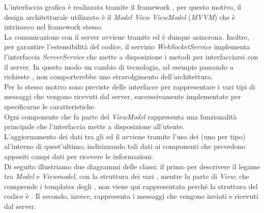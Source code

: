 L'interfaccia grafica è realizzata tramite il framework , per questo motivo, il design architetturale utilizzato è il \textit{Model View ViewModel} (\textit{MVVM}) che è intrinseco nel framework stesso. \\
La comunicazione con il server avviene tramite  ed è dunque asincrona. 
Inoltre, per garantire l'estensibilità del codice, il servizio \textit{WebSocketService} implementa l'interfaccia \textit{ServerService} che mette a disposizione i metodi per interfacciarsi con il server. In questo modo un cambio di tecnologia, ad esempio passando a richieste , non comporterebbe uno stravolgimento dell'architettura. \\
Per lo stesso motivo sono previste delle interfacce per rappresentare i vari tipi di messaggi che vengono ricevuti dal server, successivamente implementate per specificarne le caratteristiche. \\
Ogni componente che fa parte del \textit{ViewModel} rappresenta una funzionalità principale che l'interfaccia mette a disposizione all'utente.\\
 L'aggiornamento dei dati tra gli  ed il  avviene tramite l'uso dei  (uno per tipo) al'interno di quest'ultimo; indirizzando tali dati  ai componenti che prevedono appositi campi dati per ricevere le informazioni.\\
\newline
Di seguito illustriamo due diagrammi delle classi: il primo per descrivere il legame tra \textit{Model} e \textit{Viewmodel}, con la struttura dei vari , mentre la parte di \textit{View}; che comprende i templates degli , non viene qui rappresentata perché la struttura del codice è .
Il secondo, invece, rappresenta i messaggi che vengono inviati e ricevuti dal server.
\newpage


